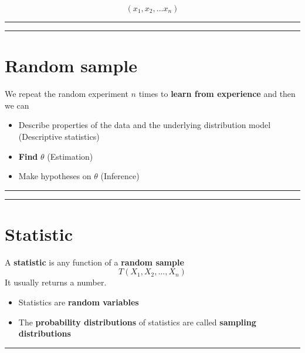\documentclass[
]{book}
\begin{document}
\[(x_1, x_2, ... x_n)\]

\begin{center}\rule{0.5\linewidth}{0.5pt}\end{center}

\begin{center}\rule{0.5\linewidth}{0.5pt}\end{center}

\hypertarget{random-sample-2}{%
\section{Random sample}\label{random-sample-2}}

We repeat the random experiment \(n\) times to \textbf{learn from experience} and then we can

\begin{itemize}
\item
  Describe properties of the data and the underlying distribution model (Descriptive statistics)
\item
  \textbf{Find} \(\theta\) (Estimation)
\item
  Make hypotheses on \(\theta\) (Inference)
\end{itemize}

\begin{center}\rule{0.5\linewidth}{0.5pt}\end{center}

\begin{center}\rule{0.5\linewidth}{0.5pt}\end{center}

\hypertarget{statistic}{%
\section{Statistic}\label{statistic}}

A \textbf{statistic} is any function of a \textbf{random sample}
\[T(X_1,X_2, ..., X_n)\]
It usually returns a number.

\begin{itemize}
\item
  Statistics are \textbf{random variables}
\item
  The \textbf{probability distributions} of statistics are called \textbf{sampling distributions}
\end{itemize}

\begin{center}\rule{0.5\linewidth}{0.5pt}\end{center}
\end{document}
